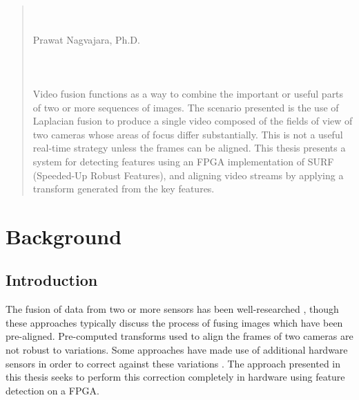\documentclass{article}
\begin{document}
\setcounter{page}{2}
\begin{center}
    \tableofcontents
    \clearpage
    
    \listoftables
    \clearpage
    
    \listoffigures
\end{center}
\clearpage

\hfill \\
\hfill \\
\hfill \\
\hfill \\


\begin{abstract}
    \singlespacing
    \centering
    \thetitle \\
    \theauthor \\
    Prawat Nagvajara, Ph.D. \\
    
    \hfill \\
    \hfill \\
    \hfill \\
    
    \doublespacing
    Video fusion functions as a way to combine the important or useful parts of two or more sequences of images. The scenario presented is the use of Laplacian fusion to produce a single video composed of the fields of view of two cameras whose areas of focus differ substantially. This is not a useful real-time strategy unless the frames can be aligned. This thesis presents a system for detecting features using an FPGA implementation of SURF (Speeded-Up Robust Features), and aligning video streams by applying a transform generated from the key features. 
\end{abstract}

\clearpage


\section{Background}

\subsection{Introduction}

The fusion of data from two or more sensors has been well-researched \cite{wang_multi-focus_2011} \cite{li_multi-sensor_1994}, though these approaches typically discuss the process of fusing images which have been pre-aligned. Pre-computed transforms used to align the frames of two cameras are not robust to variations. Some approaches have made use of additional hardware sensors in order to correct against these variations \cite{chappell_exploiting_2006}. The approach presented in this thesis seeks to perform this correction completely in hardware using feature detection on a FPGA.
\end{document}
